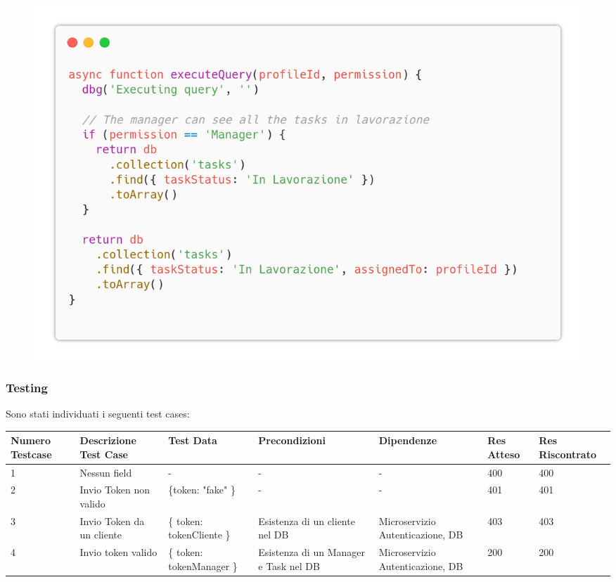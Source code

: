 \documentclass{report}
\begin{document}
\begin{figure}[H]
	\centering\includegraphics[width=1\textwidth]{images/code_in_lavorazione2.png}
\end{figure}

\subsubsection*{Testing}

Sono stati individuati i seguenti test cases:

\begin{center} %
	\centering
	\begin{tabular}{ |p{1cm}|p{2cm}|p{2cm}|p{2cm}|p{2cm}|p{1cm}|p{1cm}| }
		\hline
		Numero Testcase & Descrizione Test Case     & Test Data                 & Precondizioni                         & Dipendenze                       & Res Atteso & Res Riscontrato \\
		\hline
		1               & Nessun field              & -                         & -                                     & -                                & 400        & 400             \\
		\hline
		2               & Invio Token non valido    & \{token: "fake" \}        & -                                     & -                                & 401        & 401             \\
		\hline
		3               & Invio Token da un cliente & \{ token: tokenCliente \} & Esistenza di un cliente nel DB        & Microservizio Autenticazione, DB & 403        & 403             \\
		\hline
		4               & Invio token valido        & \{ token: tokenManager \} & Esistenza di un Manager e Task nel DB & Microservizio Autenticazione, DB & 200        & 200             \\
		\hline
	\end{tabular}
\end{center}
\end{document}
